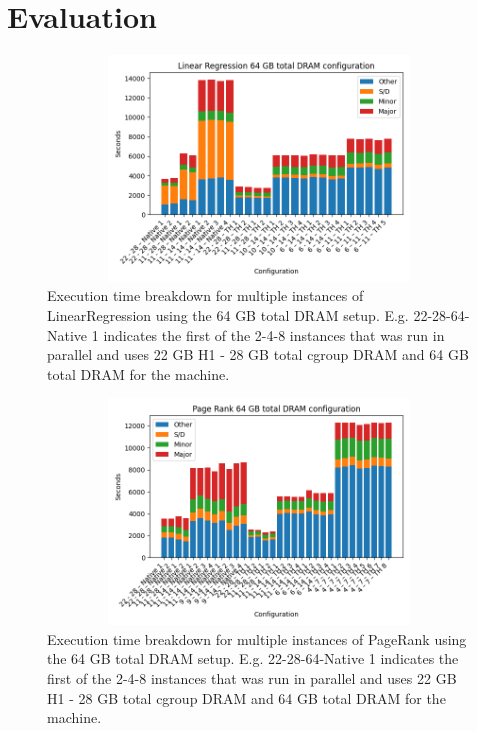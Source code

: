 \section{Evaluation}
\label{sec:eval}

\begin{figure}[ht]
	\includegraphics[width=13cm,height=6cm]{./fig/lr64.png}
    \caption{Execution time breakdown for multiple instances of
    LinearRegression using the 64 GB total DRAM setup. E.g.
    22-28-64-Native 1 indicates the first of the 2-4-8 instances that
    was run in parallel and uses 22 GB H1 - 28 GB total cgroup DRAM
    and 64 GB total DRAM for the machine.}
	\label{fig:linr64}
\end{figure}

\begin{figure}[ht]
        \includegraphics[width=13cm,height=6cm]{./fig/pr64.png}
    \caption{Execution time breakdown for multiple instances of
    PageRank using the 64 GB total DRAM setup. E.g. 22-28-64-Native 1
    indicates the first of the 2-4-8 instances that was run in
    parallel and uses 22 GB H1 - 28 GB total cgroup DRAM and 64 GB
    total DRAM for the machine.}
	\label{fig:pr64}
\end{figure}

